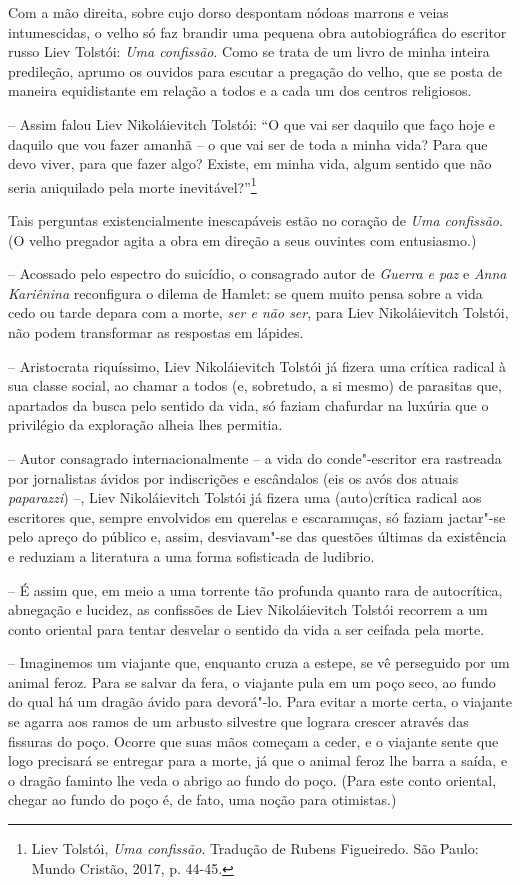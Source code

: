 Com a mão direita, sobre cujo dorso despontam nódoas marrons e veias
intumescidas, o velho só faz brandir uma pequena obra autobiográfica do
escritor russo Liev Tolstói: \emph{Uma confissão}. Como se trata de um
livro de minha inteira predileção, aprumo os ouvidos para escutar a
pregação do velho, que se posta de maneira equidistante em relação a
todos e a cada um dos centros religiosos.

-- Assim falou Liev Nikoláievitch Tolstói: ``O que vai ser daquilo que
faço hoje e daquilo que vou fazer amanhã -- o que vai ser de toda a
minha vida? Para que devo viver, para que fazer algo? Existe, em minha
vida, algum sentido que não seria aniquilado pela morte
inevitável?''\footnote{Liev Tolstói, \emph{Uma confissão}. Tradução de
  Rubens Figueiredo. São Paulo: Mundo Cristão, 2017, p. 44-45.}

Tais perguntas existencialmente inescapáveis estão no coração de
\emph{Uma confissão}. (O velho pregador agita a obra em direção a seus
ouvintes com entusiasmo.)

-- Acossado pelo espectro do suicídio, o consagrado autor de
\emph{Guerra e paz} e \emph{Anna Kariênina} reconfigura o dilema de
Hamlet: se quem muito pensa sobre a vida cedo ou tarde depara com a
morte, \emph{ser e não ser}, para Liev Nikoláievitch Tolstói, não podem
transformar as respostas em lápides.

-- Aristocrata riquíssimo, Liev Nikoláievitch Tolstói já fizera uma
crítica radical à sua classe social, ao chamar a todos (e, sobretudo, a
si mesmo) de parasitas que, apartados da busca pelo sentido da vida, só
faziam chafurdar na luxúria que o privilégio da exploração alheia lhes
permitia.

-- Autor consagrado internacionalmente -- a vida do conde"-escritor era
rastreada por jornalistas ávidos por indiscrições e escândalos (eis os
avós dos atuais \emph{paparazzi}) --, Liev Nikoláievitch Tolstói já
fizera uma (auto)crítica radical aos escritores que, sempre envolvidos
em querelas e escaramuças, só faziam jactar"-se pelo apreço do público e,
assim, desviavam"-se das questões últimas da existência e reduziam a
literatura a uma forma sofisticada de ludibrio.

-- É assim que, em meio a uma torrente tão profunda quanto rara de
autocrítica, abnegação e lucidez, as confissões de Liev Nikoláievitch
Tolstói recorrem a um conto oriental para tentar desvelar o sentido da
vida a ser ceifada pela morte.

-- Imaginemos um viajante que, enquanto cruza a estepe, se vê perseguido
por um animal feroz. Para se salvar da fera, o viajante pula em um poço
seco, ao fundo do qual há um dragão ávido para devorá"-lo. Para evitar a
morte certa, o viajante se agarra aos ramos de um arbusto silvestre que
lograra crescer através das fissuras do poço. Ocorre que suas mãos
começam a ceder, e o viajante sente que logo precisará se entregar para
a morte, já que o animal feroz lhe barra a saída, e o dragão faminto lhe
veda o abrigo ao fundo do poço. (Para este conto oriental, chegar ao
fundo do poço é, de fato, uma noção para otimistas.)

